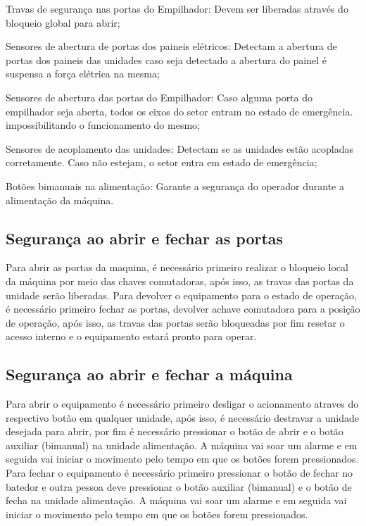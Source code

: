 \begin{safetyDevices}
  \item[\ding{\dingNumber}] Travas de segurança nas portas do Empilhador: Devem ser liberadas através do bloqueio global para abrir;
  \item[\ding{\dingNumber}] Sensores de abertura de portas dos paineis elétricos: Detectam a abertura de portas dos paineis das unidades caso seja detectado a abertura do
   painel é suspensa a força elétrica na mesma;
  \item[\ding{\dingNumber}] Sensores de abertura das portas do Empilhador: Caso alguma porta do empilhador seja aberta, todos os eixos do setor entram no estado de emergência. 
  impossibilitando o funcionamento do mesmo;
  \fi
  \item[\ding{\dingNumber}] Sensores de acoplamento das unidades: Detectam se as unidades estão acopladas corretamente. Caso não estejam, o setor entra em estado de emergência;
  \item[\ding{\dingNumber}] Botões bimanuais na alimentação: Garante a segurança do operador durante a alimentação da máquina.

\end{safetyDevices}

\ifmachineType
\subsection{Segurança ao abrir e fechar as portas}

Para abrir as portas da maquina, é necessário primeiro realizar o bloqueio local da máquina por meio das chaves comutadoras, após isso, as travas das portas da unidade 
serão liberadas. Para devolver o equipamento para o estado de operação, é necessário primeiro fechar as portas, devolver achave comutadora para a posição de 
operação, após isso, as travas das portas serão bloqueadas por fim resetar o acesso interno e o equipamento estará pronto para operar.

\else

\subsection{Segurança ao abrir e fechar a máquina}

Para abrir o equipamento é necessário primeiro desligar o acionamento atraves do respectivo botão em qualquer unidade, após isso, é necessário destravar a unidade 
desejada para abrir, por fim é necessário pressionar o botão de abrir e o botão auxiliar (bimanual) na unidade alimentação. A máquina vai soar um alarme e em seguida
vai iniciar o movimento pelo tempo em que os botões forem pressionados. Para fechar o equipamento é necessário primeiro pressionar o botão de fechar no batedor e outra
pessoa deve pressionar o botão auxiliar (bimanual) e o botão de fecha na unidade alimentação. A máquina vai soar um alarme e em seguida vai iniciar o movimento pelo tempo 
em que os botões forem pressionados.

